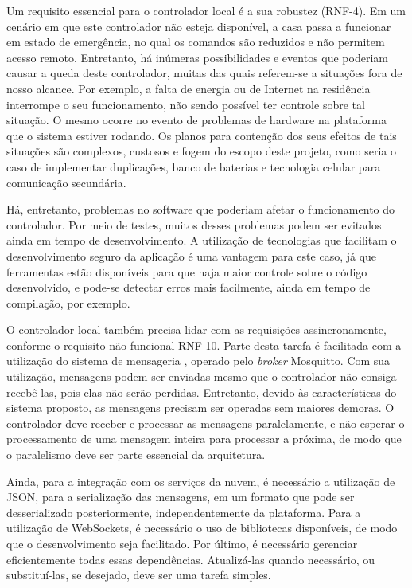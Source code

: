 Um requisito essencial para o controlador local é a sua robustez (RNF-4). Em um cenário em que este controlador não esteja disponível, a casa passa a funcionar em estado de emergência, no qual os comandos são reduzidos e não permitem acesso remoto. Entretanto, há inúmeras possibilidades e eventos que poderiam causar a queda deste controlador, muitas das quais referem-se a situações fora de nosso alcance. Por exemplo, a falta de energia ou de Internet na residência interrompe o seu funcionamento, não sendo possível ter controle sobre tal situação. O mesmo ocorre no evento de problemas de hardware na plataforma que o sistema estiver rodando. Os planos para contenção dos seus efeitos de tais situações são complexos, custosos e fogem do escopo deste projeto, como seria o caso de implementar duplicações, banco de baterias e tecnologia celular para comunicação secundária.

Há, entretanto, problemas no software que poderiam afetar o funcionamento do controlador. Por meio de testes, muitos desses problemas podem ser evitados ainda em tempo de desenvolvimento. A utilização de tecnologias que facilitam o desenvolvimento seguro da aplicação é uma vantagem para este caso, já que ferramentas estão disponíveis para que haja maior controle sobre o código desenvolvido, e pode-se detectar erros mais facilmente, ainda em tempo de compilação, por exemplo.

O controlador local também precisa lidar com as requisições assincronamente, conforme o requisito não-funcional RNF-10. Parte desta tarefa é facilitada com a utilização do sistema de mensageria \wmqtt{}, operado pelo \emph{broker} Mosquitto. Com sua utilização, mensagens podem ser enviadas mesmo que o controlador não consiga recebê-las, pois elas não serão perdidas. Entretanto, devido às características do sistema proposto, as mensagens precisam ser operadas sem maiores demoras. O controlador deve receber e processar as mensagens paralelamente, e não esperar o processamento de uma mensagem inteira para processar a próxima, de modo que o paralelismo deve ser parte essencial da arquitetura.

Ainda, para a integração com os serviços da nuvem, é necessário a utilização de JSON, para a serialização das mensagens, em um formato que pode ser desserializado posteriormente, independentemente da plataforma. Para a utilização de WebSockets, é necessário o uso de bibliotecas disponíveis, de modo que o desenvolvimento seja facilitado. Por último, é necessário gerenciar eficientemente todas essas dependências. Atualizá-las quando necessário, ou substituí-las, se desejado, deve ser uma tarefa simples.

